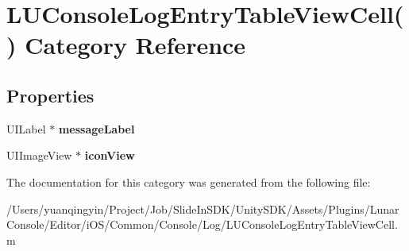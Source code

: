 \hypertarget{category_l_u_console_log_entry_table_view_cell_07_08}{}\section{L\+U\+Console\+Log\+Entry\+Table\+View\+Cell() Category Reference}
\label{category_l_u_console_log_entry_table_view_cell_07_08}
\subsection*{Properties}
\begin{DoxyCompactItemize}
\item 
\mbox{\label{category_l_u_console_log_entry_table_view_cell_07_08_a85adf7127f4604212d58e874fd4d2161}} 
U\+I\+Label $\ast$ {\bfseries message\+Label}
\item 
\mbox{\label{category_l_u_console_log_entry_table_view_cell_07_08_aeebee4b3742fea476324ed57b84fcea4}} 
U\+I\+Image\+View $\ast$ {\bfseries icon\+View}
\end{DoxyCompactItemize}


The documentation for this category was generated from the following file\+:\begin{DoxyCompactItemize}
\item 
/\+Users/yuanqingyin/\+Project/\+Job/\+Slide\+In\+S\+D\+K/\+Unity\+S\+D\+K/\+Assets/\+Plugins/\+Lunar\+Console/\+Editor/i\+O\+S/\+Common/\+Console/\+Log/L\+U\+Console\+Log\+Entry\+Table\+View\+Cell.\+m\end{DoxyCompactItemize}
